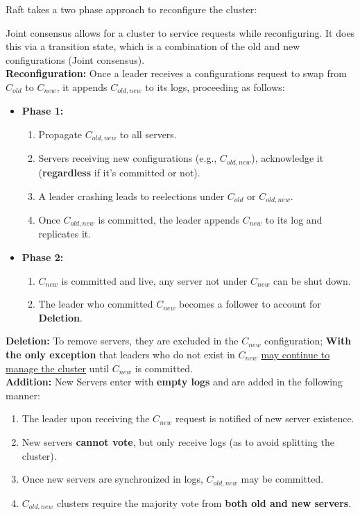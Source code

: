 \noindent
Raft takes a two phase approach to reconfigure the cluster:
\begin{Def}

    Joint consensus allows for a cluster to service requests while reconfiguring.
    It does this via a transition state, which is a combination of the old and new configurations (Joint consensus).\\

    \noindent
    \textbf{Reconfiguration:} Once a leader receives a configurations request to swap from $C_{old}$ to $C_{new}$, it appends $C_{old,new}$ to its logs, proceeding
    as follows:
    \begin{itemize}
        \item \textbf{Phase 1:}
        \begin{enumerate}
            \item Propagate $C_{old,new}$ to all servers.
            \item Servers receiving new configurations (e.g., $C_{old,new}$), acknowledge it (\textbf{regardless} if it's committed or not).
            \item A leader crashing leads to reelections under $C_{old}$ or $C_{old,new}$.
            \item Once $C_{old,new}$ is committed, the leader appends $C_{new}$ to its log and replicates it.
        \end{enumerate}
        \item \textbf{Phase 2:} 
        \begin{enumerate}
            \item $C_{new}$ is committed and live, any server not under $C_{new}$ can be shut down.
            \item The leader who committed $C_{new}$ becomes a follower to account for \textbf{Deletion}.
        \end{enumerate}
        
        
    \end{itemize}

    \noindent
    \textbf{Deletion:} To remove servers, they are excluded in the $C_{new}$ configuration; \textbf{With the only exception} that leaders who do not exist in $C_{new}$
    \underline{may continue to manage the cluster} until $C_{new}$ is committed.\\
    
    \noindent
    \textbf{Addition:} New Servers enter with \textbf{empty logs} and are added in the following manner:
    \begin{enumerate}
        \item The leader upon receiving the $C_{new}$ request is notified of new server existence.
        \item New servers \textbf{cannot vote}, but only receive logs (as to avoid splitting the cluster).
        \item Once new servers are synchronized in logs, $C_{old,new}$ may be committed.
        \item $C_{old,new}$ clusters require the majority vote from \textbf{both old and new servers}.
    \end{enumerate}
\end{Def}
